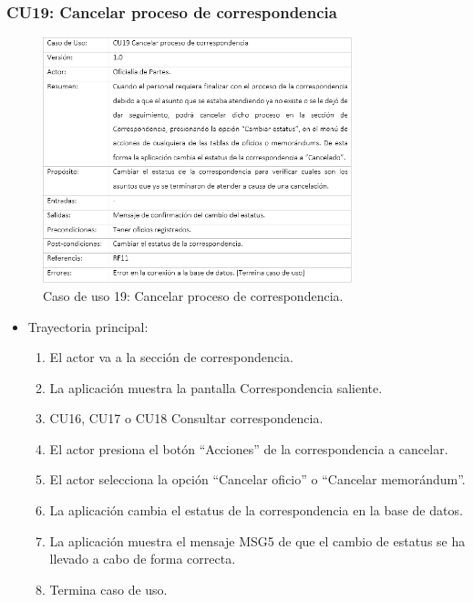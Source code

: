 \subsubsection{CU19: Cancelar proceso de correspondencia}
\begin{figure}[htbp!]
		\centering
			\includegraphics[width=0.8\textwidth]{images/CU/CU19}
		\caption{Caso de uso 19: Cancelar proceso de correspondencia.}
		\label{Tabla}
	\end{figure}
	
\begin{itemize}
	\item Trayectoria principal:
	\begin{enumerate}
		\item El actor va a la sección de correspondencia.
		\item	La aplicación muestra la pantalla  Correspondencia saliente.
		\item	CU16, CU17 o CU18 Consultar correspondencia.
		\item	El actor presiona el botón “Acciones” de la correspondencia a cancelar.
		\item	El actor selecciona la opción “Cancelar oficio” o “Cancelar memorándum”.
		\item	La aplicación cambia el estatus de la correspondencia en la base de datos.
		\item	La aplicación muestra el mensaje MSG5 de que el cambio de estatus se ha llevado a cabo de forma correcta.
\item	Termina caso de uso.

	\end{enumerate}
\end{itemize}

